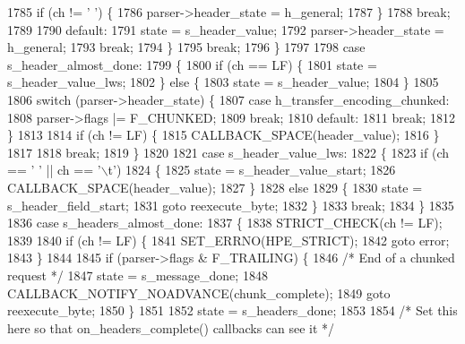 \begin{DoxyCode}
1785             \textcolor{keywordflow}{if} (ch != \textcolor{charliteral}{' '}) \{
1786               parser->header_state = h_general;
1787             \}
1788             \textcolor{keywordflow}{break};
1789 
1790           \textcolor{keywordflow}{default}:
1791             state = s_header_value;
1792             parser->header_state = h_general;
1793             \textcolor{keywordflow}{break};
1794         \}
1795         \textcolor{keywordflow}{break};
1796       \}
1797 
1798       \textcolor{keywordflow}{case} s_header_almost_done:
1799       \{
1800         \textcolor{keywordflow}{if} (ch == LF) \{
1801           state = s_header_value_lws;
1802         \} \textcolor{keywordflow}{else} \{
1803           state = s_header_value;
1804         \}
1805 
1806         \textcolor{keywordflow}{switch} (parser->header_state) \{
1807           \textcolor{keywordflow}{case} h_transfer_encoding_chunked:
1808             parser->flags |= F_CHUNKED;
1809             \textcolor{keywordflow}{break};
1810           \textcolor{keywordflow}{default}:
1811             \textcolor{keywordflow}{break};
1812         \}
1813 
1814         \textcolor{keywordflow}{if} (ch != LF) \{
1815           CALLBACK_SPACE(header\_value);
1816         \}
1817 
1818         \textcolor{keywordflow}{break};
1819       \}
1820 
1821       \textcolor{keywordflow}{case} s_header_value_lws:
1822       \{
1823         \textcolor{keywordflow}{if} (ch == \textcolor{charliteral}{' '} || ch == \textcolor{charliteral}{'\(\backslash\)t'})
1824         \{
1825           state = s_header_value_start;
1826           CALLBACK_SPACE(header\_value);
1827         \}
1828         \textcolor{keywordflow}{else}
1829         \{
1830           state = s_header_field_start;
1831           \textcolor{keywordflow}{goto} reexecute\_byte;
1832         \}
1833         \textcolor{keywordflow}{break};
1834       \}
1835 
1836       \textcolor{keywordflow}{case} s_headers_almost_done:
1837       \{
1838         STRICT_CHECK(ch != LF);
1839 
1840         \textcolor{keywordflow}{if} (ch != LF) \{
1841           SET_ERRNO(HPE_STRICT);
1842           \textcolor{keywordflow}{goto} error;
1843         \}
1844 
1845         \textcolor{keywordflow}{if} (parser->flags & F_TRAILING) \{
1846           \textcolor{comment}{/* End of a chunked request */}
1847           state = s_message_done;
1848           CALLBACK_NOTIFY_NOADVANCE(chunk\_complete);
1849           \textcolor{keywordflow}{goto} reexecute\_byte;
1850         \}
1851 
1852         state = s_headers_done;
1853 
1854         \textcolor{comment}{/* Set this here so that on\_headers\_complete() callbacks can see it */}

\end{DoxyCode}
